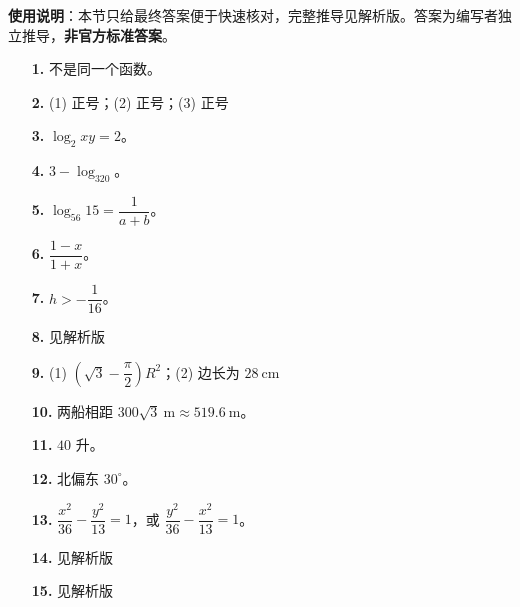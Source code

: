 
\begin{gknotice}
\textbf{使用说明}：本节只给最终答案便于快速核对，完整推导见解析版。答案为编写者独立推导，\textbf{非官方标准答案}。
\end{gknotice}

\begin{itemize}[leftmargin=2.6em]
  \item[\textbf{1.}] 不是同一个函数。
  \item[\textbf{2.}] (1) 正号；(2) 正号；(3) 正号
  \item[\textbf{3.}] $\log_2xy=2$。
  \item[\textbf{4.}] $3-\log_320$。
  \item[\textbf{5.}] $\log_{56}15=\dfrac{1}{a+b}$。
  \item[\textbf{6.}] $\dfrac{1-x}{1+x}$。
  \item[\textbf{7.}] $h>-\dfrac{1}{16}$。
  \item[\textbf{8.}] 见解析版
  \item[\textbf{9.}] (1) $\left(\sqrt3-\dfrac{\pi}{2}\right)R^2$；(2) 边长为 $28\ \mathrm{cm}$
  \item[\textbf{10.}] 两船相距 $300\sqrt3\ \mathrm{m}\approx519.6\ \mathrm{m}$。
  \item[\textbf{11.}] $40$ 升。
  \item[\textbf{12.}] 北偏东 $30^\circ$。
  \item[\textbf{13.}] $\dfrac{x^2}{36}-\dfrac{y^2}{13}=1$，或 $\dfrac{y^2}{36}-\dfrac{x^2}{13}=1$。
  \item[\textbf{14.}] 见解析版
  \item[\textbf{15.}] 见解析版
\end{itemize}
